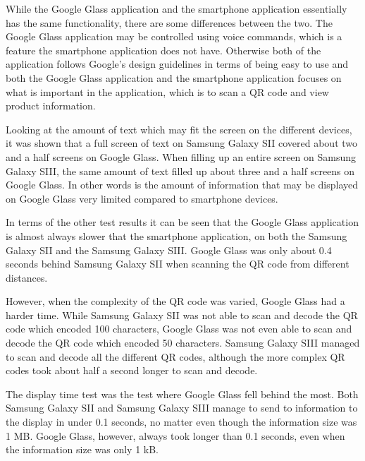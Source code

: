 While the Google Glass application and the smartphone application essentially has the same functionality, there are some differences between the two. The Google Glass application may be controlled using voice commands, which is a feature the smartphone application does not have. Otherwise both of the application follows Google's design guidelines in terms of being easy to use and both the Google Glass application and the smartphone application focuses on what is important in the application, which is to scan a QR code and view product information.

Looking at the amount of text which may fit the screen on the different devices, it was shown that a full screen of text on Samsung Galaxy SII covered about two and a half screens on Google Glass. When filling up an entire screen on Samsung Galaxy SIII, the same amount of text filled up about three and a half screens on Google Glass. In other words is the amount of information that may be displayed on Google Glass very limited compared to smartphone devices.

In terms of the other test results it can be seen that the Google Glass application is almost always slower that the smartphone application, on both the Samsung Galaxy SII and the Samsung Galaxy SIII. Google Glass was only about 0.4 seconds behind Samsung Galaxy SII when scanning the QR code from different distances.

However, when the complexity of the QR code was varied, Google Glass had a harder time. While Samsung Galaxy SII was not able to scan and decode the QR code which encoded 100 characters, Google Glass was not even able to scan and decode the QR code which encoded 50 characters. Samsung Galaxy SIII managed to scan and decode all the different QR codes, although the more complex QR codes took about half a second longer to scan and decode.

The display time test was the test where Google Glass fell behind the most. Both Samsung Galaxy SII and Samsung Galaxy SIII manage to send to information to the display in under 0.1 seconds, no matter even though the information size was 1 MB. Google Glass, however, always took longer than 0.1 seconds, even when the information size was only 1 kB.